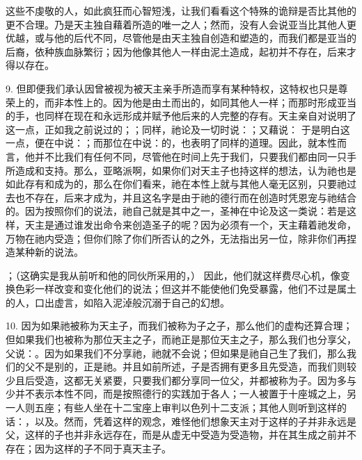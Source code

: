 这些不虔敬的人，如此疯狂而心智短浅，让我们看看这个特殊的诡辩是否比其他的更不合理。乃是天主独自藉着所造的唯一之人；然而，没有人会说亚当比其他人更优越，或与他的后代不同，尽管他是由天主独自创造和塑造的，而我们都是亚当的后裔，依种族血脉繁衍；因为他像其他人一样由泥土造成，起初并不存在，后来才得以存在。\par

9. 但即便我们承认因曾被视为被天主亲手所造而享有某种特权，这特权也只是尊荣上的，而非本性上的。因为他是由土而出的，如同其他人一样；而那时形成亚当的手，也同样在现在和永远形成并赋予他后来的人完整的存有。天主亲自对说明了这一点，正如我之前说过的；；同样，祂论及一切时说：；又藉说： 于是明白这一点，便在中说：；而那位在中说：的，也表明了同样的道理。因此，就本性而言，他并不比我们有任何不同，尽管他在时间上先于我们，只要我们都由同一只手所造成和支持。那么，亚略派啊，如果你们对天主子也持这样的想法，认为祂也是如此存有和成为的，那么在你们看来，祂在本性上就与其他人毫无区别，只要祂过去也不存在，后来才成为，并且这名字是由于祂的德行而在创造时凭恩宠与祂结合的。因为按照你们的说法，祂自己就是其中之一，圣神在中论及这一类说：若是这样，天主是通过谁发出命令来创造圣子的呢？因为必须有一个，天主藉着祂发命，万物在祂内受造；但你们除了你们所否认的之外，无法指出另一位，除非你们再捏造某种新的说法。\par

；（这确实是我从前听和他的同伙所采用的，） 因此，他们就这样费尽心机，像变换色彩一样改变和变化他们的说法；但这并不能使他们免受暴露，他们不过是属土的人，口出虚言，如陷入泥淖般沉溺于自己的幻想。\par

10. 因为如果祂被称为天主子，而我们被称为子之子，那么他们的虚构还算合理；但如果我们也被称为那位天主之子，而祂正是那位天主之子，那么我们也分享父，父说：。因为如果我们不分享祂，祂就不会说；但如果是祂自己生了我们，那么我们的父不是别的，正是祂。并且如前所述，子是否拥有更多且先受造，而我们则较少且后受造，这都无关紧要，只要我们都分享同一位父，并都被称为子。因为多与少并不表示本性不同，而是按照德行的实践加于各人；一人被置于十座城之上，另一人则五座；有些人坐在十二宝座上审判以色列十二支派；其他人则听到这样的话：，以及。然而，凭着这样的观念，难怪他们想象天主对于这样的子并非永远是父，这样的子也并非永远存在，而是从虚无中受造为受造物，并在其生成之前并不存在；因为这样的子不同于真天主子。\par

